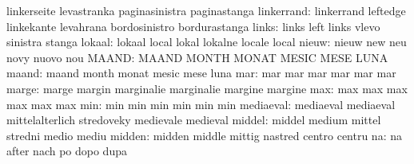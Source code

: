                            linkerseite               levastranka
                           paginasinistra            paginastanga
               linkerrand: linkerrand                leftedge
                           linkekante                levahrana
                           bordosinistro             bordurastanga
                    links: links                     left
                           links                     vlevo
                           sinistra                  stanga
                   lokaal: lokaal                    local
                           lokal                     lokalne
                           locale                    local
                    nieuw: nieuw                     new
                           neu                       novy
                           nuovo                     nou
                    MAAND: MAAND                     MONTH
                           MONAT                     MESIC
                           MESE                      LUNA
                    maand: maand                     month
                           monat                     mesic
                           mese                      luna
                      mar: mar                       mar
                           mar                       mar
                           mar                       mar
                    marge: marge                     margin
                           marginalie                marginalie
                           margine                   margine
                      max: max                       max
                           max                       max
                           max                       max
                      min: min                       min
                           min                       min
                           min                       min
                mediaeval: mediaeval                 mediaeval
                           mittelalterlich           stredoveky
                           medievale                 medieval
                   middel: middel                    medium
                           mittel                    stredni
                           medio                     mediu
                   midden: midden                    middle
                           mittig                    nastred
                           centro                    centru
                       na: na                        after
                           nach                      po
                           dopo                      dupa
